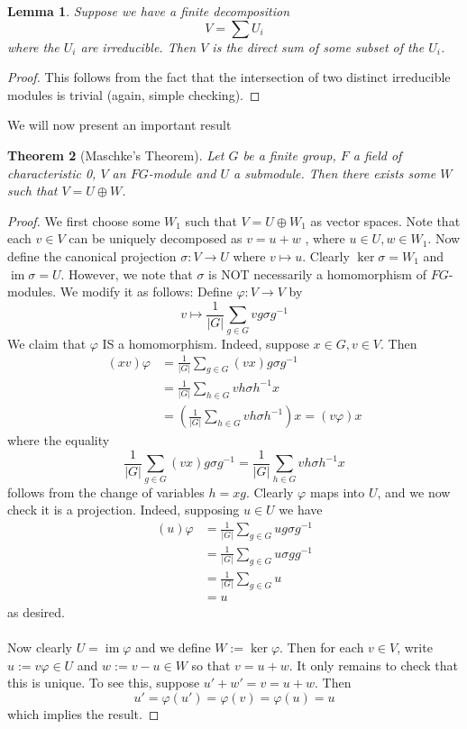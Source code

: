 \documentclass[11pt, notitlepage]{article}
\numberwithin{equation}{section}
\theoremstyle{plain}
\newtheorem{theorem}{Theorem}[section]
\newtheorem{lemma}[theorem]{Lemma}
\theoremstyle{definition}
\DeclareMathOperator{\im}{im}
\begin{document}
\begin{lemma}
	Suppose we have a finite decomposition
\[
	V = \sum U_i
\]
where the $U_i$ are irreducible. Then $V$ is the direct sum of some subset of the $U_i$. 
\end{lemma}
\begin{proof}
	This follows from the fact that the intersection of two distinct irreducible modules is trivial (again, simple checking).
\end{proof}

We will now present an important result
\begin{theorem} [Maschke's Theorem]
	Let $G$ be a finite group, $F$ a field of characteristic 0, $V$ an $FG$-module and $U$ a submodule. Then there exists some $W$ such that $V = U \oplus W$.
\end{theorem}
\begin{proof}
	We first choose some $W_1$ such that $V = U \oplus W_1$ as vector spaces. Note that each $v\in V$ can be uniquely decomposed as $v = u + w$ , where $u\in U, w\in W_1$. Now define the canonical projection $\sigma: V \rightarrow U$ where $v \mapsto u$. Clearly $\ker \sigma = W_1$ and $\im \sigma = U$. However, we note that $\sigma$ is NOT necessarily a homomorphism of $FG$-modules. We modify it as follows: Define $\varphi: V \rightarrow V$ by
\[
	v\mapsto \frac{1}{{|G|}} \sum_{g\in G} vg\sigma g^{-1}
\]
We claim that $\varphi$ IS a homomorphism. Indeed, suppose $x\in G, v\in V$. Then 
	\begin{align*}
		(xv)\varphi &= \frac{1}{{|G|}} \sum_{g\in G} (vx)g\sigma g^{-1}\\
		&= \frac{1}{{|G|}} \sum_{h\in G} vh\sigma h^{-1}x \\
		&= \left(\frac{1}{{|G|}} \sum_{h\in G} vh\sigma h^{-1}\right)x = (v\varphi)x
	\end{align*}
	where the equality
\[
	\frac{1}{{|G|}} \sum_{g\in G} (vx)g\sigma g^{-1}= \frac{1}{{|G|}} \sum_{h\in G} vh\sigma h^{-1}x
\]
follows from the change of variables $h = xg$. Clearly $\varphi$ maps into $U$, and we now check it is a projection. Indeed, supposing $u\in U$ we have 
	\begin{align*}
		(u)\varphi &= \frac{1}{{|G|}} \sum_{g\in G} ug\sigma g^{-1} \\
		&= \frac{1}{{|G|}} \sum_{g\in G} u\sigma gg^{-1} \\
		&= \frac{1}{{|G|}} \sum_{g\in G} u\\
		&= u
	\end{align*}
	as desired. 
	\\\\
	Now clearly $U = \im \varphi$ and we define $W:= \ker \varphi$. Then for each $v\in V$, write $u:= v\varphi \in U$ and $w:= v - u\in W$ so that $v = u + w$. It only remains to check that this is unique. To see this, suppose $u' + w' = v = u + w$. Then
\[
	u' = \varphi(u') = \varphi(v) = \varphi(u) = u
\]
which implies the result.
\end{proof}
\end{document}

